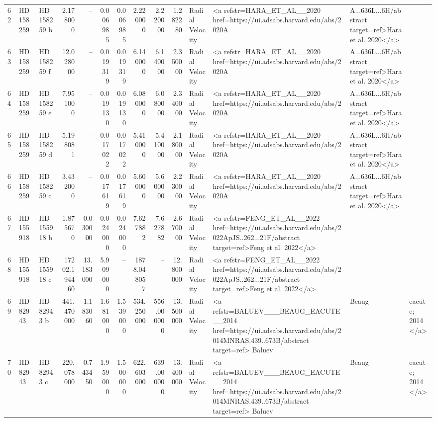 \begin{tabular}{lllrrrrrrrll}
62 & HD 158259 & HD 158259 b & 2.178000 & -- & 0.006985 & 0.006985 & 2.220000 & 2.220000 & 1.282280 & Radial Velocity & <a refstr=HARA_ET_AL__2020 href=https://ui.adsabs.harvard.edu/abs/2020A&A...636L...6H/abstract target=ref>Hara et al. 2020</a> \\
63 & HD 158259 & HD 158259 f & 12.028000 & -- & 0.019319 & 0.019319 & 6.140000 & 6.140000 & 2.350000 & Radial Velocity & <a refstr=HARA_ET_AL__2020 href=https://ui.adsabs.harvard.edu/abs/2020A&A...636L...6H/abstract target=ref>Hara et al. 2020</a> \\
64 & HD 158259 & HD 158259 e & 7.951000 & -- & 0.019130 & 0.019130 & 6.080000 & 6.080000 & 2.340000 & Radial Velocity & <a refstr=HARA_ET_AL__2020 href=https://ui.adsabs.harvard.edu/abs/2020A&A...636L...6H/abstract target=ref>Hara et al. 2020</a> \\
65 & HD 158259 & HD 158259 d & 5.198081 & -- & 0.017022 & 0.017022 & 5.410000 & 5.410000 & 2.180000 & Radial Velocity & <a refstr=HARA_ET_AL__2020 href=https://ui.adsabs.harvard.edu/abs/2020A&A...636L...6H/abstract target=ref>Hara et al. 2020</a> \\
66 & HD 158259 & HD 158259 c & 3.432000 & -- & 0.017619 & 0.017619 & 5.600000 & 5.600000 & 2.230000 & Radial Velocity & <a refstr=HARA_ET_AL__2020 href=https://ui.adsabs.harvard.edu/abs/2020A&A...636L...6H/abstract target=ref>Hara et al. 2020</a> \\
67 & HD 155918 & HD 155918 b & 1.875670 & 0.030000 & 0.024000 & 0.024000 & 7.627882 & 7.627882 & 2.670000 & Radial Velocity & <a refstr=FENG_ET_AL__2022 href=https://ui.adsabs.harvard.edu/abs/2022ApJS..262...21F/abstract target=ref>Feng et al. 2022</a> \\
68 & HD 155918 & HD 155918 c & 17202.194460 & 13.183000 & 5.909000 & -- & 1878.048057 & -- & 12.800000 & Radial Velocity & <a refstr=FENG_ET_AL__2022 href=https://ui.adsabs.harvard.edu/abs/2022ApJS..262...21F/abstract target=ref>Feng et al. 2022</a> \\
69 & HD 82943 & HD 82943 b & 441.470000 & 1.183060 & 1.681000 & 1.539000 & 534.250000 & 556.000000 & 13.500000 & Radial Velocity & <a refstr=BALUEV___BEAUG_EACUTE__2014 href=https://ui.adsabs.harvard.edu/abs/2014MNRAS.439..673B/abstract target=ref> Baluev & Beaug&eacute; 2014</a> \\
70 & HD 82943 & HD 82943 c & 220.078000 & 0.743450 & 1.959000 & 1.500000 & 622.603000 & 639.000000 & 13.400000 & Radial Velocity & <a refstr=BALUEV___BEAUG_EACUTE__2014 href=https://ui.adsabs.harvard.edu/abs/2014MNRAS.439..673B/abstract target=ref> Baluev & Beaug&eacute; 2014</a> \\

\end{tabular}
